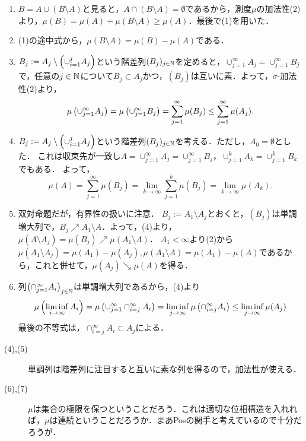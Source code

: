 \documentclass[uplatex, dvipdfmx]{jsreport}
\begin{document}
\begin{Proof}\mbox{}
    \begin{enumerate}
        \item $B=A\cup(B\setminus A)$と見ると，$A\cap(B\setminus A)=\emptyset$であるから，測度$\mu$の加法性(2)より，$\mu(B)=\mu(A)+\mu(B\setminus A)\ge\mu(A)$．最後で(1)を用いた．
        \item (1)の途中式から，$\mu(B\setminus A)=\mu(B)-\mu(A)$である．
        \item $B_j:=A_j\setminus\left(\cup_{i=1}^jA_j\right)$という階差列$(B_j)_{j\in\mathbb{N}}$を定めると，$\cup_{j=1}^\infty A_j=\cup_{j=1}^\infty B_j$で，任意の$j\in\mathbb{N}$について$B_j\subset A_j$かつ，$(B_j)$は互いに素．よって，$\sigma$-加法性(2)より，
        \[\mu\left(\cup_{j=1}^\infty A_j\right)=\mu\left(\cup_{j=1}^\infty B_j\right)=\sum^\infty_{j=1}\mu(B_j)\le\sum^\infty_{j=1}\mu(A_j).\]
        \item $B_j:=A_j\setminus\left(\cup_{i=1}^jA_j\right)$という階差列$(B_j)_{j\in\mathbb{N}}$を考える．ただし，$A_0=\emptyset$とした．
        これは収束先が一致し$A=\cup_{j=1}^\infty A_j=\cup_{j=1}^\infty B_j$，$\cup_{j=1}^kA_k=\cup_{j=1}^kB_k$でもある．
        よって，
        \[\mu(A)=\sum^\infty_{j=1}\mu(B_j)=\lim_{k\to\infty}\sum_{j=1}^k\mu(B_j)=\lim_{k\to\infty}\mu(A_k).\]
        \item 双対命題だが，有界性の扱いに注意．
        $B_j:=A_1\setminus A_j$とおくと，$(B_j)$は単調増大列で，$B_j\nearrow A_1\setminus A$．よって，(4)より，$\mu(A\setminus A_j)=\mu(B_j)\nearrow\mu(A_1\setminus A)$．
        $A_1<\infty$より(2)から$\mu(A_1\setminus A_j)=\mu(A_1)-\mu(A_j),\mu(A_1\setminus A)=\mu(A_1)-\mu(A)$であるから，これと併せて，$\mu(A_j)\searrow\mu(A)$を得る．
        \item 列$\left(\cap^\infty_{j=1}A_i\right)_{j\in\mathbb{N}}$は単調増大列であるから，(4)より
        \[\mu\left(\liminf_{i\to\infty}A_i\right)=\mu\left(\cup^\infty_{j=1}\cap^\infty_{i=j}A_i\right)=\liminf_{j\to\infty}\mu\left(\cap^\infty_{i=j}A_i\right)\le\liminf_{j\to\infty}\mu(A_j)\]
        最後の不等式は，$\cap^\infty_{i=j}A_i\subset A_j$による．
    \end{enumerate}
\end{Proof}
\begin{remarks}\mbox{}
    \begin{description}
        \item[(4),(5)] 単調列は階差列に注目すると互いに素な列を得るので，加法性が使える．
        \item[(6),(7)] $\mu$は集合の極限を保つということだろう．これは適切な位相構造を入れれば，$\mu$は連続ということだろうか．まあPosの関手と考えているので十分だろうが．
    \end{description}
\end{remarks}
\end{document}
